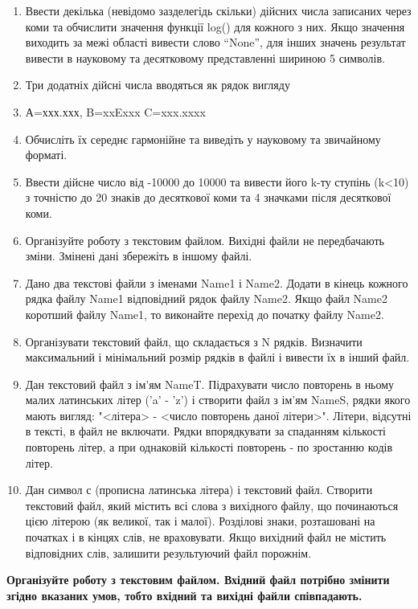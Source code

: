 \documentclass[]{article}
\begin{document}
\begin{enumerate}
\def\labelenumi{\arabic{enumi})}
\item
  Ввести декілька (невідомо зазделегідь скільки) дійсних числа записаних
  через коми та обчислити значення функції log() для кожного з них. Якщо
  значення виходить за межі області вивести слово ``None'', для інших
  значень результат вивести в науковому та десятковому представленні
  шириною 5 символів.
\item
  Три додатніх дійсні числа вводяться як рядок вигляду
\item
  А=ххх.ххх, B=xxExxx C=xxx.xxxx
\item
  Обчисліть їх середнє гармонійне та виведіть у науковому та звичайному
  форматі.
\item
  Ввести дійсне число від -10000 до 10000 та вивести його k-ту ступінь
  (k\textless{}10) з точністю до 20 знаків до десяткової коми та 4
  значками після десяткової коми.
\item
  Організуйте роботу з текстовим файлом. Вихідні файли не передбачають
  зміни. Змінені дані збережіть в іншому файлі.
\item
  Дано два текстові файли з іменами Name1 і Name2. Додати в кінець
  кожного рядка файлу Name1 відповідний рядок файлу Name2. Якщо файл
  Name2 коротший файлу Name1, то виконайте перехід до початку файлу
  Name2.
\item
  Організувати текстовий файл, що складається з N рядків. Визначити
  максимальний і мінімальний розмір рядків в файлі і вивести їх в інший
  файл.
\item
  Дан текстовий файл з ім'ям NameT. Підрахувати число повторень в ньому
  малих латинських літер ('a' - 'z') і створити файл з ім'ям NameS,
  рядки якого мають вигляд: "\textless{}літера\textgreater{} -
  \textless{}число повторень даної літери\textgreater{}". Літери,
  відсутні в тексті, в файл не включати. Рядки впорядкувати за спаданням
  кількості повторень літер, а при однаковій кількості повторень - по
  зростанню кодів літер.
\item
  Дан символ с (прописна латинська літера) і текстовий файл. Створити
  текстовий файл, який містить всі слова з вихідного файлу, що
  починаються цією літерою (як великої, так і малої). Розділові знаки,
  розташовані на початках і в кінцях слів, не враховувати. Якщо вихідний
  файл не містить відповідних слів, залишити результуючий файл порожнім.
\end{enumerate}

\textbf{Організуйте роботу з текстовим файлом. Вхідний файл потрібно
змінити згідно вказаних умов, тобто вхідний та вихідні файли
співпадають.}
\end{document}
